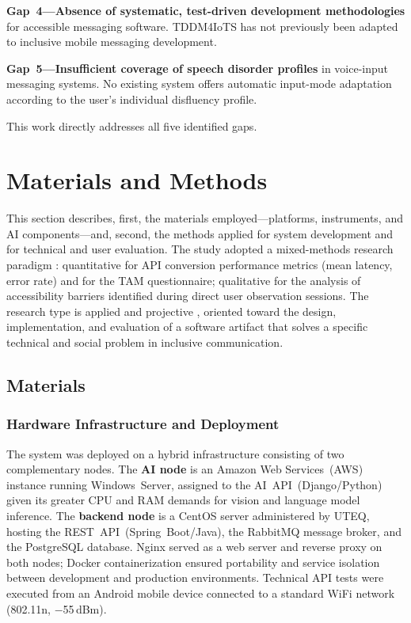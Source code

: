 \documentclass[journal]{IEEEtran}
\begin{document}
	\textbf{Gap~4---Absence of systematic, test-driven development
		methodologies} for accessible messaging software.
	TDDM4IoTS has not previously been adapted to inclusive mobile
	messaging development.
	
	\textbf{Gap~5---Insufficient coverage of speech disorder profiles}
	in voice-input messaging systems.
	No existing system offers automatic input-mode adaptation
	according to the user's individual disfluency profile.
	
	This work directly addresses all five identified gaps.
	
	\section{Materials and Methods}
	\label{sec:methodology}
	This section describes, first, the materials employed---platforms,
	instruments, and AI components---and, second, the methods applied
	for system development and for technical and user evaluation.
	The study adopted a mixed-methods research paradigm \cite{hernandez2014}:
	quantitative for API conversion performance metrics (mean latency,
	error rate) and for the TAM questionnaire; qualitative for the
	analysis of accessibility barriers identified during direct user
	observation sessions.
	The research type is applied and projective \cite{hernandez2014},
	oriented toward the design, implementation, and evaluation of a
	software artifact that solves a specific technical and social
	problem in inclusive communication.
	
	\subsection{Materials}
	
	\subsubsection{Hardware Infrastructure and Deployment}
	The system was deployed on a hybrid infrastructure consisting of two
	complementary nodes.
	The \textbf{AI node} is an Amazon Web Services~(AWS) instance
	running Windows~Server, assigned to the AI~API~(Django/Python)
	given its greater CPU and RAM demands for vision and language model
	inference.
	The \textbf{backend node} is a CentOS server administered by
	UTEQ, hosting the REST~API~(Spring~Boot/Java), the RabbitMQ
	message broker, and the PostgreSQL database.
	Nginx served as a web server and reverse proxy on both nodes;
	Docker containerization ensured portability and service isolation
	between development and production environments.
	Technical API tests were executed from an Android mobile device
	connected to a standard WiFi network (802.11n, $-$55\,dBm).
	
\end{document}

